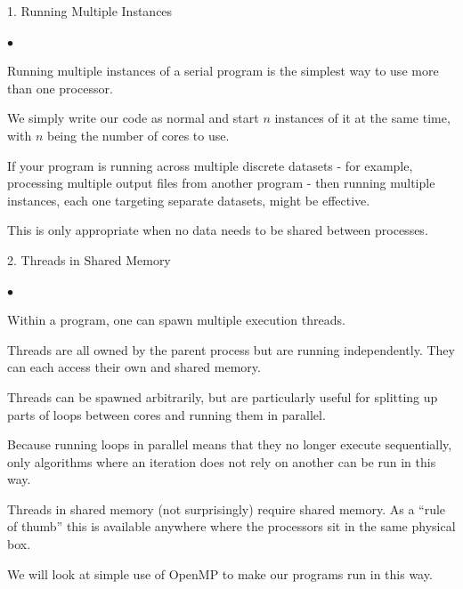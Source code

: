 \documentclass[smaller,handout,table]{beamer}
\begin{document}
\begin{frame}{1. Running Multiple Instances}
\begin{list}{$\bullet$}{}
\item Running multiple instances of a serial program is the simplest way to use more than one processor.
\item We simply write our code as normal and start $n$ instances of it at the same time, with $n$ being the number of cores to use.
\item If your program is running across multiple discrete datasets - for example, processing multiple output files from another program - then running multiple instances, each one targeting separate datasets, might be effective.
\item This is only appropriate when no data needs to be shared between processes.
\end{list}
\end{frame}

\begin{frame}{2. Threads in Shared Memory}
\begin{list}{$\bullet$}{}
\item Within a program, one can spawn multiple execution threads.
\item Threads are all owned by the parent process but are running independently. They can each access their own and shared memory.
\item Threads can be spawned arbitrarily, but are particularly useful for splitting up parts of \texttt{} loops between cores and running them in parallel.
\item Because running loops in parallel means that they no longer execute sequentially, only algorithms where an iteration does not rely on another can be run in this way.
\item Threads in shared memory (not surprisingly) require shared memory. As a ``rule of thumb'' this is available anywhere where the processors sit in the same physical box.
\item We will look at simple use of OpenMP to make our programs run in this way.
\end{list}
\end{frame}
\end{document}
